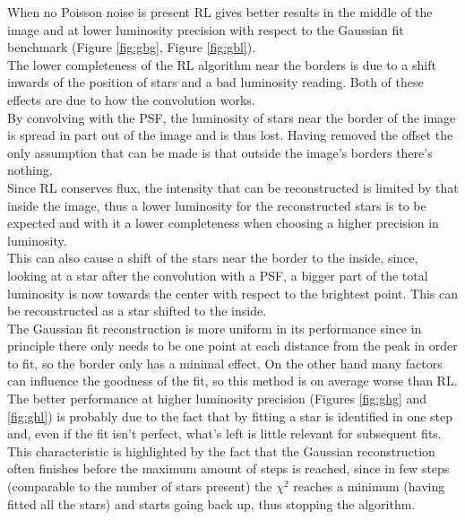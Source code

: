 \documentclass[a4paper]{article}
\begin{document}
	\begin{multicols}{2}
			When no Poisson noise is present RL gives better results in the middle of the image and at lower luminosity precision with respect to the Gaussian fit benchmark (Figure \ref{fig:gbg}, Figure \ref{fig:gbl}).\\
			
			The lower completeness of the RL algorithm near the borders is due to a shift inwards of the position of stars and a bad luminosity reading. Both of these effects are due to how the convolution works.\\
			
			By convolving with the PSF, the luminosity of stars near the border of the image is spread in part out of the image and is thus lost. Having removed the offset the only assumption that can be made is that outside the image's borders there's nothing.\\
			
			Since RL conserves flux, the intensity that can be reconstructed is limited by that inside the image, thus a lower luminosity for the reconstructed stars is to be expected and with it a lower completeness when choosing a higher precision in luminosity.\\
			This can also cause a shift of the stars near the border to the inside, since, looking at a star after the convolution with a PSF, a bigger part of the total luminosity is now towards the center with respect to the brightest point. This can be reconstructed as a star shifted to the inside.\\
			
			The Gaussian fit reconstruction is more uniform in its performance since in principle there only needs to be one point at each distance from the peak in order to fit, so the border only has a minimal effect. On the other hand many factors can influence the goodness of the fit, so this method is on average worse than RL.\\
			The better performance at higher luminosity precision (Figures \ref{fig:ghg} and \ref{fig:ghl}) is probably due to the fact that by fitting a star is identified in one step and, even if the fit isn't perfect, what's left is little relevant for subsequent fits. This characteristic is highlighted by the fact that the Gaussian reconstruction often finishes before the maximum amount of steps is reached, since in few steps (comparable to the number of stars present) the $\chi^2$ reaches a minimum (having fitted all the stars) and starts going back up, thus stopping the algorithm.\\
			

\end{multicols}
\end{document}
